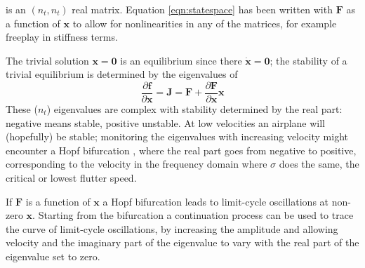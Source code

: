 \documentclass[11pt,openany,twoside]{book}
\numberwithin{equation}{section}		%
\def\Cpp{{C\nolinebreak[4]\hspace{-.05em}\raisebox{.4ex}{\tiny\bf ++}}\:}
\newcommand{\Cmd}[1]{{\sf #1}}
\newcommand{\Flaps}{\textsc{Flaps\:}}
\newcommand{\Matrix}[1]{\boldsymbol{#1}}
\newcommand{\Vector}[1]{\boldsymbol{#1}}
\begin{document}
is an $(n_t,n_t)$ real matrix.
Equation \ref{eqn:statespace} has been written with $\Vector{F}$ as a
function of $\Vector{x}$ to allow for nonlinearities in any of the matrices,
for example freeplay in stiffness terms.

The trivial solution $\Vector{x}=\Vector{0}$ is an equilibrium since there
$\dot{\Vector{x}} = \Vector{0}$; the stability of a trivial equilibrium is determined
by the eigenvalues of
\begin{equation}
\frac{\partial\Vector{f}}{\partial\Vector{x}} = \Matrix{J} =
	\Matrix{F} + \frac{\partial\Vector{F}}{\partial\Vector{x}}\Vector{x}
\end{equation}
These ($n_t$) eigenvalues are complex with stability determined by the real part:
negative means stable, positive unstable.
At low velocities an airplane will (hopefully) be stable; monitoring the eigenvalues
with increasing velocity might encounter a Hopf bifurcation \cite{seydel1988equilibrium},
where the real part goes from negative to positive, corresponding to the velocity in the
frequency domain where $\sigma$ does the same, the critical or lowest flutter speed.

If $\Matrix{F}$ is a function of $\Vector{x}$ a Hopf bifurcation leads to limit-cycle
oscillations at non-zero $\Vector{x}$.
Starting from the bifurcation a continuation process can be used to trace
the curve of limit-cycle oscillations, by increasing the amplitude and allowing
velocity and the imaginary part of the eigenvalue to vary with the real part
of the eigenvalue set to zero.


\end{document}
